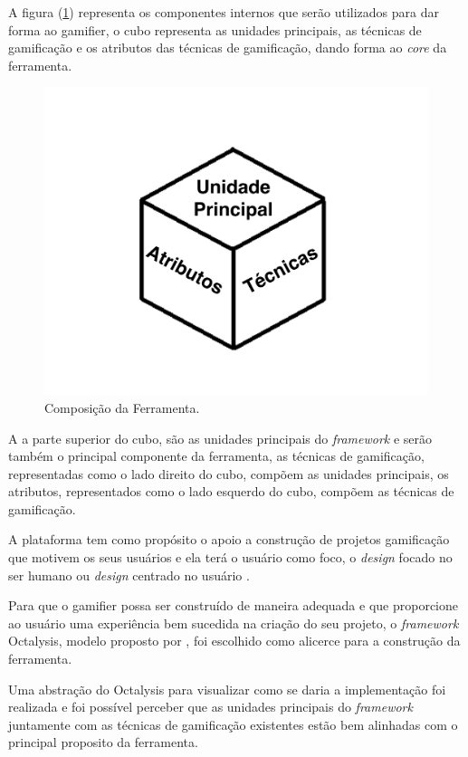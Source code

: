 A figura (\ref{fig01}) representa os componentes internos que serão utilizados para dar forma ao gamifier, o cubo representa as unidades principais, as técnicas de gamificação e os atributos das técnicas de gamificação, dando forma ao \textit{core} da ferramenta.

\begin{figure}[h]
	\centering
		\includegraphics[keepaspectratio=true,scale=0.5]{figuras/hcgd.png}
	\caption{Composição da Ferramenta.\label{fig01}}
\end{figure}


A a parte superior do cubo, são as unidades principais do \textit{framework} e serão também o principal componente da ferramenta, as técnicas de gamificação, representadas como o lado direito do cubo, compõem as unidades principais, os atributos, representados como o lado esquerdo do cubo, compõem as técnicas de gamificação. 

A plataforma tem como propósito o apoio a construção de projetos gamificação que motivem os seus usuários e ela terá o usuário como foco, o \textit{design} focado no ser humano \cite{chou2015actionable} ou \textit{design}  centrado no usuário \cite{kumar2013gamification}.


Para que o gamifier possa ser construído de maneira adequada e que proporcione ao usuário uma experiência bem sucedida na criação do seu projeto, o \textit{framework} Octalysis, modelo proposto por \cite{chou2015actionable} , foi escolhido como alicerce para a construção da ferramenta.

Uma abstração do Octalysis para visualizar como se daria a implementação foi realizada e foi possível perceber que as unidades principais do \textit{framework} juntamente com as técnicas de gamificação existentes estão bem alinhadas com o principal proposito da ferramenta. 

